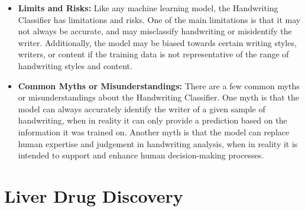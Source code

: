 \begin{itemize}
    \item \textbf{Limits and Risks:} Like any machine learning model, the Handwriting Classifier has limitations and risks. One of the main limitations is that it may not always be accurate, and may misclassify handwriting or misidentify the writer. Additionally, the model may be biased towards certain writing styles, writers, or content if the training data is not representative of the range of handwriting styles and content.
    \item \textbf{Common Myths or Misunderstandings:} There are a few common myths or misunderstandings about the Handwriting Classifier. One myth is that the model can always accurately identify the writer of a given sample of handwriting, when in reality it can only provide a prediction based on the information it was trained on. Another myth is that the model can replace human expertise and judgement in handwriting analysis, when in reality it is intended to support and enhance human decision-making processes.
\end{itemize}

\section{Liver Drug Discovery}

